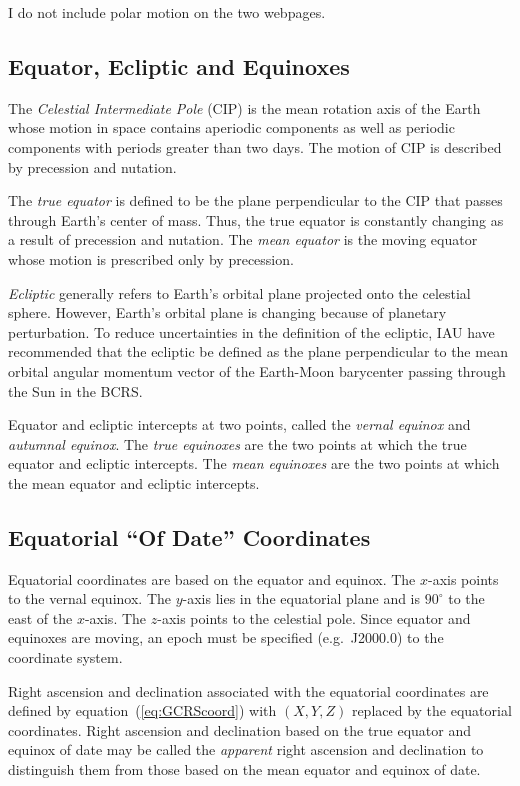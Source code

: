 \documentclass[12pt]{article}
\begin{document}
I do not include polar motion on the two webpages.

\subsection{Equator, Ecliptic and Equinoxes}

The {\em Celestial Intermediate Pole} (CIP) is the mean rotation axis of the Earth 
whose motion in space contains aperiodic components as well as periodic 
components with periods greater than two days. The motion of CIP is described 
by precession and nutation.

The {\em true equator} is defined to be the plane perpendicular to the CIP 
that passes through Earth's center of mass. Thus, the true equator is constantly 
changing as a result of precession and nutation. The {\em mean equator} 
is the moving equator whose motion is prescribed only by precession. 

{\em Ecliptic} generally refers to Earth's orbital plane projected onto the 
celestial sphere. However, Earth's orbital plane is changing because of 
planetary perturbation. To reduce uncertainties in the definition of the 
ecliptic, IAU have recommended that the ecliptic be defined as the plane 
perpendicular to the mean orbital angular momentum vector of the Earth-Moon 
barycenter passing through the Sun in the BCRS.

Equator and ecliptic intercepts at two points, called the {\em vernal equinox} and 
{\em autumnal equinox}. The {\em true equinoxes} are the two points at which the true 
equator and ecliptic intercepts. The {\em mean equinoxes} are the two points 
at which the mean equator and ecliptic intercepts.

\subsection{Equatorial ``Of Date'' Coordinates} 

Equatorial coordinates are based on the equator and equinox. The $x$-axis 
points to the vernal equinox. The $y$-axis lies in the equatorial plane 
and is $90^\circ$ to the east of the $x$-axis. The $z$-axis points to 
the celestial pole. Since equator 
and equinoxes are moving, an epoch must be specified (e.g.\ J2000.0) to the coordinate 
system.  

Right ascension and declination associated with the equatorial coordinates 
are defined by equation~(\ref{eq:GCRScoord}) with $(X,Y,Z)$ replaced by the 
equatorial coordinates. Right ascension and declination based on the 
true equator and equinox of date may be called the {\em apparent} right ascension and 
declination to distinguish them from those based on the mean equator and 
equinox of date.
\end{document}
